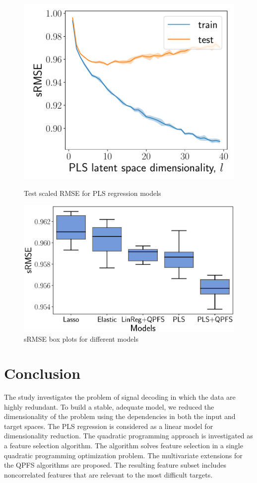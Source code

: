 \documentclass[preprint,12pt]{elsarticle}
\theoremstyle{definition}
\begin{document}
\begin{figure}[h]
	\begin{minipage}{.41\linewidth}
		\centering
		\includegraphics[width=1.\linewidth]{figs/pls_vs_k}
		\caption{Test scaled RMSE for PLS regression models}
		\label{fig:pls_vs_k}
	\end{minipage}%
	\begin{minipage}{.57\linewidth}
		\centering
		\includegraphics[width=1.\linewidth]{figs/models2}
		\caption{sRMSE box plots for different models}
		\label{fig:models}
	\end{minipage}
\end{figure}

\section{Conclusion}
The study investigates the problem of signal decoding in which the data are highly redundant.
To build a stable, adequate model, we reduced the dimensionality of the problem using the dependencies in both the input and target spaces.
The PLS regression is considered as a linear model for dimensionality reduction.
The quadratic programming approach is investigated as a feature selection algorithm.
The algorithm solves feature selection in a single quadratic programming optimization problem.
The multivariate extensions for the QPFS algorithms are proposed.
The resulting feature subset includes noncorrelated features that are relevant to the most difficult targets.
\end{document}
